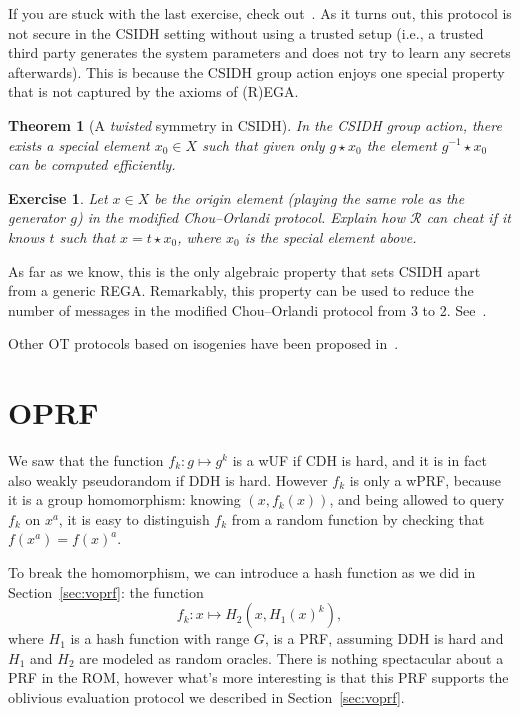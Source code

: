 \documentclass{article}
\newtheorem{ex}{Exercise}
\newtheorem{thm}[defi]{Theorem}
\begin{document}
If you are stuck with the last exercise, check
out~\cite[Fig.~2]{EPRINT:LaiGaldeS20}.  As it turns out, this protocol
is not secure in the CSIDH setting without using a trusted setup
(i.e., a trusted third party generates the system parameters and does
not try to learn any secrets afterwards).  This is because the CSIDH
group action enjoys one special property that is not captured by the
axioms of (R)EGA.

\begin{thm}[A \emph{twisted} symmetry in CSIDH]
  In the CSIDH group action, there exists a special element $x_0\in X$
  such that given only $g\star x_0$ the element $g^{-1}\star x_0$ can
  be computed efficiently.
\end{thm}

\begin{ex}
  Let $x\in X$ be the origin element (playing the same role as the
  generator $g$) in the modified Chou--Orlandi protocol.  Explain how
  $\mathcal{R}$ can cheat if it knows $t$ such that $x = t\star x_0$,
  where $x_0$ is the special element above.
\end{ex}

As far as we know, this is the only algebraic property that sets CSIDH
apart from a generic REGA.  Remarkably, this property can be used to
reduce the number of messages in the modified Chou--Orlandi protocol
from 3 to 2.  See~\cite[Fig.~2]{EPRINT:LaiGaldeS20}.

Other OT protocols based on isogenies have been proposed
in~\cite{EPRINT:BarOliBen18,AFRICACRYPT:Vitse19,CANS:dOPS20,AC:ADMP20}.


\section{OPRF}

We saw that the function $f_k: g\mapsto g^k$ is a wUF if CDH is hard,
and it is in fact also weakly pseudorandom if DDH is hard.  However
$f_k$ is only a wPRF, because it is a group homomorphism: knowing
$(x,f_k(x))$, and being allowed to query $f_k$ on $x^a$, it is easy to
distinguish $f_k$ from a random function by checking that
$f(x^a) = f(x)^a$.

To break the homomorphism, we can introduce a hash function as we did
in Section~\ref{sec:voprf}: the function
\[f_k : x \mapsto H_2(x, H_1(x)^k),\] where $H_1$ is a hash function
with range $G$, is a PRF, assuming DDH is hard and $H_1$ and $H_2$ are
modeled as random oracles.  There is nothing spectacular about a PRF
in the ROM, however what's more interesting is that this PRF supports
the oblivious evaluation protocol we described in
Section~\ref{sec:voprf}.
\end{document}
